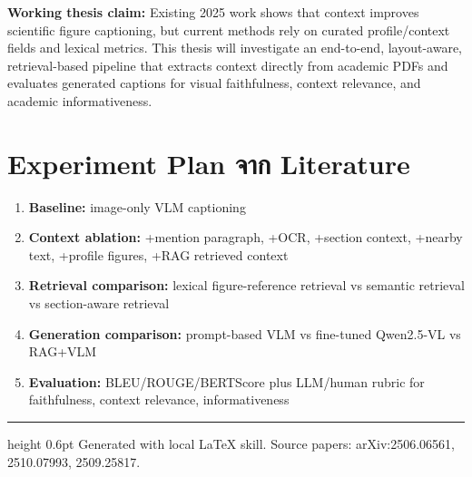 \documentclass[10pt,a4paper]{article}
\begin{document}
\begin{note}
\textbf{Working thesis claim:} Existing 2025 work shows that context improves scientific figure captioning, but current methods rely on curated profile/context fields and lexical metrics. This thesis will investigate an end-to-end, layout-aware, retrieval-based pipeline that extracts context directly from academic PDFs and evaluates generated captions for visual faithfulness, context relevance, and academic informativeness.
\end{note}

\section{Experiment Plan จาก Literature}
\begin{enumerate}
\item \textbf{Baseline:} image-only VLM captioning
\item \textbf{Context ablation:} +mention paragraph, +OCR, +section context, +nearby text, +profile figures, +RAG retrieved context
\item \textbf{Retrieval comparison:} lexical figure-reference retrieval vs semantic retrieval vs section-aware retrieval
\item \textbf{Generation comparison:} prompt-based VLM vs fine-tuned Qwen2.5-VL vs RAG+VLM
\item \textbf{Evaluation:} BLEU/ROUGE/BERTScore plus LLM/human rubric for faithfulness, context relevance, informativeness
\end{enumerate}

\vspace{4pt}
\hrule height 0.6pt
\vspace{3pt}
{\color{muted}\footnotesize Generated with local LaTeX skill. Source papers: arXiv:2506.06561, 2510.07993, 2509.25817.}
\end{document}
